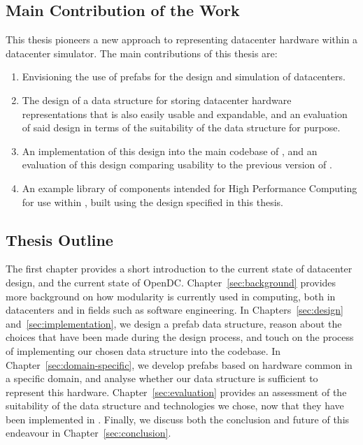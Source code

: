 \documentclass[11pt]{article}
\begin{document}
	\subsection{Main Contribution of the Work}
		This thesis pioneers a new approach to representing datacenter hardware within a datacenter simulator.
		The main contributions of this thesis are:
		\begin{enumerate}
			\item Envisioning the use of prefabs for the design and simulation of datacenters.
			\item The design of a data structure for storing datacenter hardware representations that is also easily usable and expandable, and an evaluation of said design in terms of the suitability of the data structure for purpose.
			\item An implementation of this design into the main codebase of \opendc{}, and an evaluation of this design comparing usability to the previous version of \opendc{}.
			\item An example library of components intended for High Performance Computing for use within \opendc{}, built using the design specified in this thesis.
		\end{enumerate}
	
	\subsection{Thesis Outline}
		The first chapter provides a short introduction to the current state of datacenter design, and the current state of OpenDC. 
		Chapter~\ref{sec:background} provides more background on how modularity is currently used in computing, both in datacenters and in fields such as software engineering. 
		In Chapters~\ref{sec:design} and~\ref{sec:implementation}, we design a prefab data structure, reason about the choices that have been made during the design process, and touch on the process of implementing our chosen data structure into the \opendc{} codebase.
		In Chapter~\ref{sec:domain-specific}, we develop prefabs based on hardware common in a specific domain, and analyse whether our data structure is sufficient to represent this hardware.
		Chapter~\ref{sec:evaluation} provides an assessment of the suitability of the data structure and technologies we chose, now that they have been implemented in \opendc{}.
		Finally, we discuss both the conclusion and future of this endeavour in Chapter~\ref{sec:conclusion}.
	
\end{document}

